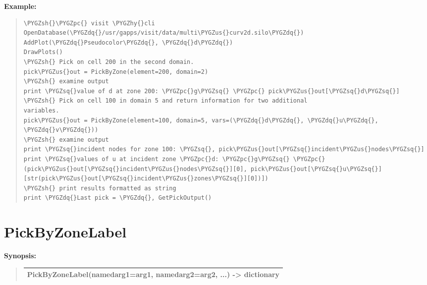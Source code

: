 \documentclass[letterpaper,10pt,english]{sphinxmanual}
\def\PYGZus{\char`\_}
\def\PYGZsh{\char`\#}
\def\PYGZpc{\char`\%}
\def\PYGZhy{\char`\-}
\def\PYGZsq{\char`\'}
\def\PYGZdq{\char`\"}
\renewcommand\PYGZsq{\textquotesingle}
\begin{document}
\begin{DUlineblock}{0em}
\item[] \textbf{Example:}
\item[] 
\end{DUlineblock}
\begin{quote}

\begin{Verbatim}[commandchars=\\\{\}]
\PYGZsh{}\PYGZpc{} visit \PYGZhy{}cli
OpenDatabase(\PYGZdq{}/usr/gapps/visit/data/multi\PYGZus{}curv2d.silo\PYGZdq{})
AddPlot(\PYGZdq{}Pseudocolor\PYGZdq{}, \PYGZdq{}d\PYGZdq{})
DrawPlots()
\PYGZsh{} Pick on cell 200 in the second domain.
pick\PYGZus{}out = PickByZone(element=200, domain=2)
\PYGZsh{} examine output
print \PYGZsq{}value of d at zone 200: \PYGZpc{}g\PYGZsq{} \PYGZpc{} pick\PYGZus{}out[\PYGZsq{}d\PYGZsq{}]
\PYGZsh{} Pick on cell 100 in domain 5 and return information for two additional
variables.
pick\PYGZus{}out = PickByZone(element=100, domain=5, vars=(\PYGZdq{}d\PYGZdq{}, \PYGZdq{}u\PYGZdq{}, \PYGZdq{}v\PYGZdq{}))
\PYGZsh{} examine output
print \PYGZsq{}incident nodes for zone 100: \PYGZsq{}, pick\PYGZus{}out[\PYGZsq{}incident\PYGZus{}nodes\PYGZsq{}]
print \PYGZsq{}values of u at incident zone \PYGZpc{}d: \PYGZpc{}g\PYGZsq{} \PYGZpc{} (pick\PYGZus{}out[\PYGZsq{}incident\PYGZus{}nodes\PYGZsq{}][0], pick\PYGZus{}out[\PYGZsq{}u\PYGZsq{}][str(pick\PYGZus{}out[\PYGZsq{}incident\PYGZus{}zones\PYGZsq{}][0])])
\PYGZsh{} print results formatted as string
print \PYGZdq{}Last pick = \PYGZdq{}, GetPickOutput()
\end{Verbatim}
\end{quote}


\section{PickByZoneLabel}
\label{functions:pickbyzonelabel}
\begin{DUlineblock}{0em}
\item[] \textbf{Synopsis:}
\end{DUlineblock}
\begin{quote}

\begin{tabulary}{\linewidth}{|L|}
\hline

PickByZoneLabel(namedarg1=arg1, namedarg2=arg2, ...) -\textgreater{} dictionary
\\
\hline\end{tabulary}

\end{quote}
\end{document}
